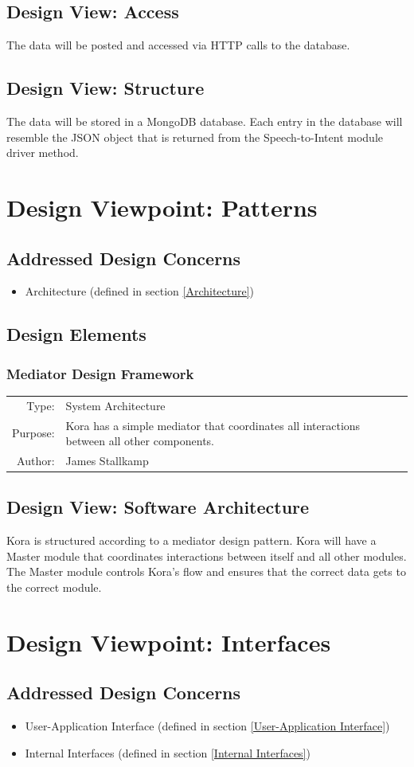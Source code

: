 \documentclass[onecolumn, draftclsnofoot,10pt, compsoc]{IEEEtran}
\def \botname{Kora\xspace}
\newcommand{\designConcernRef}[1]{
    #1 (defined in section \ref{#1})
}
\newcommand{\designElementDef}[4]{
    \subsubsection{#1}\label{#1}
        \begin{tabular}[t]{r p{6in}}
            Type: & #2 \\
            Purpose: & #3 \\
            Author: & #4 \\
        \end{tabular}
}
\begin{document}
	\subsection{Design View: Access}
		The data will be posted and accessed via HTTP calls to the database.
	
	\subsection{Design View: Structure}
		The data will be stored in a MongoDB database.
		Each entry in the database will resemble the JSON object that is returned from the Speech-to-Intent module driver method.
		
		

\section{Design Viewpoint: Patterns}
    \subsection{Addressed Design Concerns}
        \begin{itemize}
            \item \designConcernRef{Architecture}
        \end{itemize}

    \subsection{Design Elements}
		\designElementDef{Mediator Design Framework}
						 {System Architecture}
						 {\botname has a simple mediator that coordinates all interactions between all other components.}
						 {James Stallkamp}
    \subsection{Design View: Software Architecture}
		\botname is structured according to a mediator design pattern. 
		\botname will have a Master module that coordinates interactions between itself and all other modules.
		The Master module controls \botname's flow and ensures that the correct data gets to the correct module.


\section{Design Viewpoint: Interfaces}
    \subsection{Addressed Design Concerns}
        \begin{itemize}
            \item \designConcernRef{User-Application Interface}
            \item \designConcernRef{Internal Interfaces}
        \end{itemize}
\end{document}
